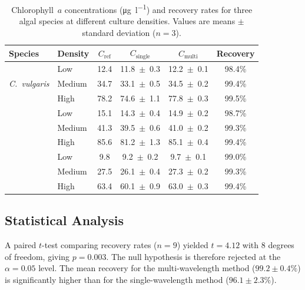 \documentclass[
    language=english,
    doctype=article,
    institution=none,
    titlestyle=book,
]{../../omnilatex}
\begin{document}
\begin{table}[htbp]
    \centering
    \caption{Chlorophyll~$a$ concentrations (\si{\micro\gram\per\litre}) and
    recovery rates for three algal species at different culture densities.
    Values are means $\pm$ standard deviation ($n = 3$).}
    \label{tab:results}
    \begin{tabular}{@{}llcccc@{}}
        \toprule
        \textbf{Species} & \textbf{Density} & $C_{\text{ref}}$ &
            $C_{\text{single}}$ & $C_{\text{multi}}$ &
            \textbf{Recovery} \\
        \midrule
        \multirow{3}{*}{\emph{C.~vulgaris}}
            & Low    & 12.4 & 11.8 \,$\pm$\, 0.3 & 12.2 \,$\pm$\, 0.1 & 98.4\% \\
            & Medium & 34.7 & 33.1 \,$\pm$\, 0.5 & 34.5 \,$\pm$\, 0.2 & 99.4\% \\
            & High   & 78.2 & 74.6 \,$\pm$\, 1.1 & 77.8 \,$\pm$\, 0.3 & 99.5\% \\
        \addlinespace
        \multirow{3}{*}{\emph{S.~obliquus}}
            & Low    & 15.1 & 14.3 \,$\pm$\, 0.4 & 14.9 \,$\pm$\, 0.2 & 98.7\% \\
            & Medium & 41.3 & 39.5 \,$\pm$\, 0.6 & 41.0 \,$\pm$\, 0.2 & 99.3\% \\
            & High   & 85.6 & 81.2 \,$\pm$\, 1.3 & 85.1 \,$\pm$\, 0.4 & 99.4\% \\
        \addlinespace
        \multirow{3}{*}{\emph{A.~falcatus}}
            & Low    &  9.8 &  9.2 \,$\pm$\, 0.2 &  9.7 \,$\pm$\, 0.1 & 99.0\% \\
            & Medium & 27.5 & 26.1 \,$\pm$\, 0.4 & 27.3 \,$\pm$\, 0.2 & 99.3\% \\
            & High   & 63.4 & 60.1 \,$\pm$\, 0.9 & 63.0 \,$\pm$\, 0.3 & 99.4\% \\
        \bottomrule
    \end{tabular}
\end{table}

\subsection{Statistical Analysis}
A paired $t$-test comparing recovery rates ($n = 9$) yielded $t = 4.12$ with
$8$ degrees of freedom, giving $p = 0.003$.  The null hypothesis is therefore
rejected at the $\alpha = 0.05$ level.  The mean recovery for the multi-wavelength
method ($99.2 \pm 0.4\%$) is significantly higher than for the single-wavelength
method ($96.1 \pm 2.3\%$).
\end{document}
